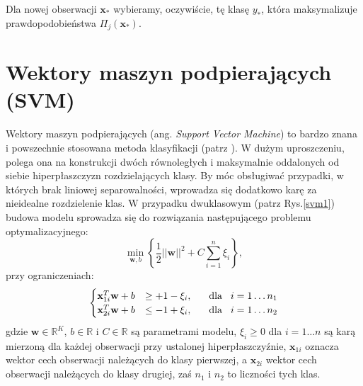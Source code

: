 \documentclass{mini}
\begin{document}
Dla nowej obserwacji $\mathbf{x}_{\ast}$ wybieramy, oczywiście, tę klasę $y_{\ast}$, która maksymalizuje prawdopodobieństwa $\Pi_j(\mathbf{x}_{\ast})$.

\section{Wektory maszyn podpierających (SVM)}

Wektory maszyn podpierających (ang. \textit{Support Vector Machine}) to bardzo znana i powszechnie stosowana metoda klasyfikacji (patrz \cite{koronacki}). W dużym uproszczeniu, polega ona na konstrukcji dwóch równoległych i maksymalnie oddalonych od siebie hiperpłaszczyzn rozdzielających klasy. By móc obsługiwać przypadki, w których brak liniowej separowalności, wprowadza się dodatkowo karę za nieidealne rozdzielenie klas. W przypadku dwuklasowym (patrz Rys.\ref{svm1}) budowa modelu sprowadza się do rozwiązania następującego problemu optymalizacyjnego:
$$
\min_{\mathbf{w}, b}\left\lbrace\dfrac{1}{2}||\textbf{w}||^2+C\sum_{i=1}^{n}\xi_i\right\rbrace,
$$
przy ograniczeniach:
$$
\begin{cases}
\mathbf{x}^T_{1i}\textbf{w}+b &\geq +1-\xi_i, \hspace{6mm} \text{dla}\hspace{3mm}i=1\ldots n_1 \\
\mathbf{x}^T_{2i}\textbf{w}+b &\leq -1+\xi_i, \hspace{6mm} \text{dla}\hspace{3mm}i=1\ldots n_2
\end{cases}
$$    
gdzie $\mathbf{w}\in\mathbb{R}^K$, $b\in\mathbb{R}$ i $C\in\mathbb{R}$ są parametrami modelu, $\xi_i\geq 0$ dla $i=1\ldots n$ są karą mierzoną dla każdej obserwacji przy ustalonej hiperpłaszczyźnie, $\mathbf{x}_{1i}$ oznacza wektor cech obserwacji należących do klasy pierwszej, a $\mathbf{x}_{2i}$ wektor cech obserwacji należących do klasy drugiej, zaś $n_1$ i $n_2$ to liczności tych klas. 
\end{document}
